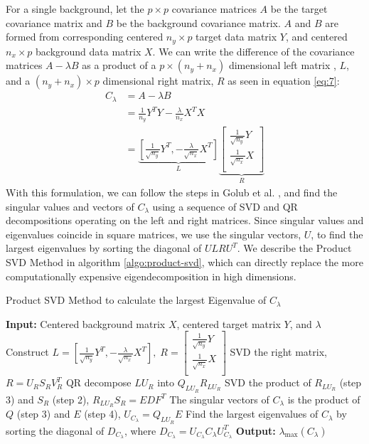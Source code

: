 \documentclass[12pt]{article}
\begin{document}
For a single background, let the $p \times p$ covariance matrices $A$ be the target covariance matrix and $B$ be the background covariance matrix. $A$ and $B$ are formed from corresponding centered $n_y \times p$ target data matrix $Y$,   and centered $n_x \times p$ background data matrix $X$.  We can write the difference of the covariance matrices $A - \lambda B$ as a product of a $p \times (n_y + n_x)$ dimensional left matrix , $L$, and a $(n_y + n_x) \times p$ dimensional right matrix, $R$ as seen in equation \ref{eq:7}:
\begin{align}
  C_\lambda &= A - \lambda B \nonumber\\
            &=\frac{1}{n_y}Y^TY -\frac{\lambda}{n_x} X^T X\nonumber \\
            &=  \underbrace{\left[ \frac{1}{\sqrt{n_{y}}}Y^T, - \frac{\lambda}{\sqrt{n_{x}}} X^T\right]}_{L}\underbrace{\begin{bmatrix*} \frac{1}{\sqrt{n_{y}}}Y \\ \frac{1}{\sqrt{n_{x}}}X \\ \end{bmatrix*}}_{R} \label{eq:7}
\end{align}
With this formulation, we can follow the steps in Golub et al.  \cite{Golub}, and find the singular values and vectors of $C_\lambda$ using a sequence of SVD and QR decompositions operating on the left and right matrices. Since singular values and eigenvalues coincide in square matrices, we use the singular vectors, $U$, to find the largest eigenvalues by sorting the diagonal of $ULRU^T$.  
We describe the Product SVD Method in algorithm \ref{algo:product-svd}, which can directly replace the more computationally expensive eigendecomposition in high dimensions.

\begin{algorithm}[ht]
  \caption{Product SVD Method to calculate the largest Eigenvalue of $C_\lambda$}
  \label{algo:product-svd}
  \SetAlgoLined
  \textbf{Input:} Centered background matrix $X$, centered target matrix $Y$, and $\lambda$\;
  \nl Construct 
  $  L = \left[ \frac{1}{\sqrt{n_{y}}}Y^T, - \frac{\lambda}{\sqrt{n_{x}}} X^T\right],\;
  R = \begin{bmatrix*} \frac{1}{\sqrt{n_{y}}}Y \\ \frac{1}{\sqrt{n_{x}}}X \\ \end{bmatrix*} $\;
  \nl  SVD the right matrix, $R = U_R S_R V^T_R$ \;
  \nl  QR decompose $LU_R$ into  $Q_{LU_R}R_{LU_R}$ \;
  \nl  SVD the product of $R_{LU_R}$ (step 3) and $S_R$ (step 2), $R_{LU_R}S_{R} = EDF^T$ \;
  \nl  The singular vectors of $C_\lambda$ is the product of $Q$ (step 3) and $E$ (step 4), $U_{C_\lambda} = Q_{LU_R}E$ \;
  \nl  Find the largest eigenvalues of $C_\lambda$ by sorting the diagonal of $D_{C_\lambda}$, where $D_{C_\lambda} = U_{C_\lambda} C_\lambda U_{C_\lambda}^T$ \;
  \textbf{Output:} $\lambda_{\text{max}}\left( C_\lambda \right)$ 
\end{algorithm}
\end{document}
